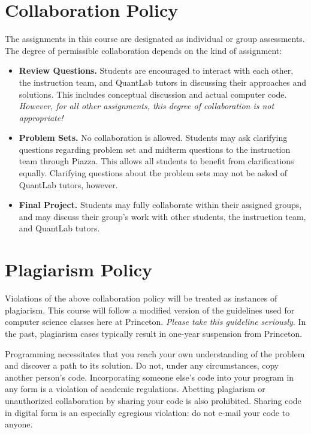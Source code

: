 \documentclass[11pt,letterpaper]{article}
\begin{document}
\section*{Collaboration Policy}

The assignments in this course are designated as individual or group
assessments. The degree of permissible collaboration depends on the kind of
assignment:

\begin{itemize}
\item {\bf Review Questions.} Students are encouraged to interact with
  each other, the instruction team, and QuantLab tutors in discussing
  their approaches and solutions. This includes conceptual discussion
  and actual computer code. \textit{However, for all other
    assignments, this degree of collaboration is not appropriate!}

\item {\bf Problem Sets.}  No collaboration is allowed. Students may
  ask clarifying questions regarding problem set and midterm questions
  to the instruction team through Piazza. This allows all students to
  benefit from clarifications equally. Clarifying questions about the
  problem sets may not be asked of QuantLab tutors, however.

\item {\bf Final Project.} Students may fully collaborate within their
  assigned groups, and may discuss their group's work with other
  students, the instruction team, and QuantLab tutors.
\end{itemize}

\section*{Plagiarism Policy}

Violations of the above collaboration policy will be treated as instances of
plagiarism. This course will follow a modified version of the guidelines used
for computer science classes here at Princeton.  {\it Please take this guideline
  seriously}.  In the past, plagiarism cases typically result in one-year
suspension from Princeton.

Programming necessitates that you reach your own understanding of the
problem and discover a path to its solution.  {\sc Do not, under any
  circumstances, copy another person's code}. Incorporating someone
else's code into your program in any form is a violation of academic
regulations. Abetting plagiarism or unauthorized collaboration by
sharing your code is also prohibited. Sharing code in digital form is
an especially egregious violation: do not e-mail your code to anyone.
\end{document}
